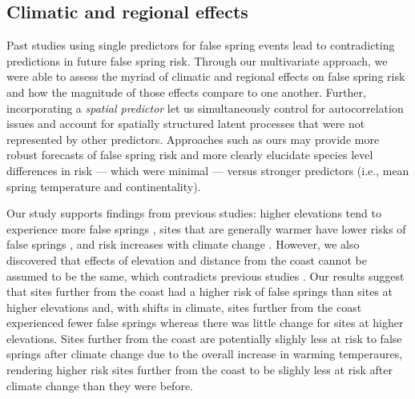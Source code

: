 \documentclass{article}\usepackage[]{graphicx}\usepackage[]{color}
\begin{document}
\subsection*{Climatic and regional effects}
Past studies using single predictors for false spring events \citep{Liu2018, Ma2018, Vitasse2018, Vitra2017, Wypych2016a} lead to contradicting predictions in future false spring risk. Through our multivariate approach, we were able to assess the myriad of climatic and regional effects on false spring risk and how the magnitude of those effects compare to one another. Further, incorporating a \emph{spatial predictor} let us simultaneously control for autocorrelation issues and account for spatially structured latent processes that were not represented by other predictors. Approaches such as ours may provide more robust forecasts of false spring risk and more clearly elucidate species level differences in risk --- which were minimal --- versus stronger predictors (i.e., mean spring temperature and continentality). 

Our study supports findings from previous studies: higher elevations tend to experience more false springs \citep{Vitasse2018, Vitra2017}, sites that are generally warmer have lower risks of false springs \citep{Wypych2016}, and risk increases with climate change \citep{Liu2018}. However, we also discovered that effects of elevation and distance from the coast cannot be assumed to be the same, which contradicts previous studies \citep{Ma2018}. Our results suggest that sites further from the coast had a higher risk of false springs than sites at higher elevations and, with shifts in climate, sites further from the coast experienced fewer false springs whereas there was little change for sites at higher elevations. Sites further from the coast are potentially slighly less at risk to false springs after climate change due to the overall increase in warming temperaures, rendering higher risk sites further from the coast to be slighly less at risk after climate change than they were before.
 
\end{document}
